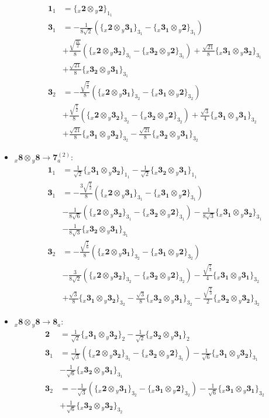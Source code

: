 \documentclass[english]{article}
\newcommand{\rep}[1]{\mathbf{#1}}
\newcommand{\repx}[2]{{}_{#2}\mathbf{#1}}
\newcommand{\tsprodx}[2]{\repx{#1}{x}\otimes\repx{#2}{y}}
\newcommand{\subcgs}[3]{\big\{ \tsprodx{#1}{#2}\big\}^{}_{#3}}
\begin{document}
\begin{itemize}
\begin{align*}
\rep{1}_{1} & = \subcgs{2}{2}{1_{1}}
\\
\rep{3}_{1} & = -\frac{1}{8 \sqrt{2}}\left(\subcgs{2}{3_{1}}{3_{1}}-\subcgs{3_{1}}{2}{3_{1}}\right) \\ 
 & +\frac{\sqrt{\frac{21}{2}}}{8}\left(\subcgs{2}{3_{2}}{3_{1}}-\subcgs{3_{2}}{2}{3_{1}}\right)+\frac{\sqrt{21}}{8}\subcgs{3_{1}}{3_{2}}{3_{1}} \\ 
 & +\frac{\sqrt{21}}{8}\subcgs{3_{2}}{3_{1}}{3_{1}}
\\
\rep{3}_{2} & = -\frac{\sqrt{\frac{3}{2}}}{8}\left(\subcgs{2}{3_{1}}{3_{2}}-\subcgs{3_{1}}{2}{3_{2}}\right) \\ 
 & +\frac{\sqrt{\frac{7}{2}}}{8}\left(\subcgs{2}{3_{2}}{3_{2}}-\subcgs{3_{2}}{2}{3_{2}}\right)+\frac{\sqrt{3}}{4}\subcgs{3_{1}}{3_{1}}{3_{2}} \\ 
 & +\frac{\sqrt{21}}{8}\subcgs{3_{1}}{3_{2}}{3_{2}}-\frac{\sqrt{21}}{8}\subcgs{3_{2}}{3_{1}}{3_{2}}
\end{align*}
\item $\tsprodx{8}{8}\to\rep{7}_{a}^{(2)}$:
\begin{align*}
\rep{1}_{1} & = \frac{1}{\sqrt{2}}\subcgs{3_{1}}{3_{2}}{1_{1}}-\frac{1}{\sqrt{2}}\subcgs{3_{2}}{3_{1}}{1_{1}}
\\
\rep{3}_{1} & = -\frac{3 \sqrt{\frac{7}{2}}}{8}\left(\subcgs{2}{3_{1}}{3_{1}}-\subcgs{3_{1}}{2}{3_{1}}\right) \\ 
 & -\frac{1}{8 \sqrt{6}}\left(\subcgs{2}{3_{2}}{3_{1}}-\subcgs{3_{2}}{2}{3_{1}}\right)-\frac{1}{8 \sqrt{3}}\subcgs{3_{1}}{3_{2}}{3_{1}} \\ 
 & -\frac{1}{8 \sqrt{3}}\subcgs{3_{2}}{3_{1}}{3_{1}}
\\
\rep{3}_{2} & = -\frac{\sqrt{\frac{7}{6}}}{8}\left(\subcgs{2}{3_{1}}{3_{2}}-\subcgs{3_{1}}{2}{3_{2}}\right) \\ 
 & -\frac{3}{8 \sqrt{2}}\left(\subcgs{2}{3_{2}}{3_{2}}-\subcgs{3_{2}}{2}{3_{2}}\right)-\frac{\sqrt{\frac{7}{3}}}{4}\subcgs{3_{1}}{3_{1}}{3_{2}} \\ 
 & +\frac{\sqrt{3}}{8}\subcgs{3_{1}}{3_{2}}{3_{2}}-\frac{\sqrt{3}}{8}\subcgs{3_{2}}{3_{1}}{3_{2}}-\frac{\sqrt{\frac{7}{3}}}{2}\subcgs{3_{2}}{3_{2}}{3_{2}}
\end{align*}
\item $\tsprodx{8}{8}\to\rep{8}_{a}$:
\begin{align*}
\rep{2} & = \frac{1}{\sqrt{2}}\subcgs{3_{1}}{3_{2}}{2}-\frac{1}{\sqrt{2}}\subcgs{3_{2}}{3_{1}}{2}
\\
\rep{3}_{1} & = \frac{1}{\sqrt{3}}\left(\subcgs{2}{3_{2}}{3_{1}}-\subcgs{3_{2}}{2}{3_{1}}\right)-\frac{1}{\sqrt{6}}\subcgs{3_{1}}{3_{2}}{3_{1}} \\ 
 & -\frac{1}{\sqrt{6}}\subcgs{3_{2}}{3_{1}}{3_{1}}
\\
\rep{3}_{2} & = -\frac{1}{\sqrt{3}}\left(\subcgs{2}{3_{1}}{3_{2}}-\subcgs{3_{1}}{2}{3_{2}}\right)-\frac{1}{\sqrt{6}}\subcgs{3_{1}}{3_{1}}{3_{2}} \\ 
 & +\frac{1}{\sqrt{6}}\subcgs{3_{2}}{3_{2}}{3_{2}}
\end{align*}
\end{itemize}
\end{document}
